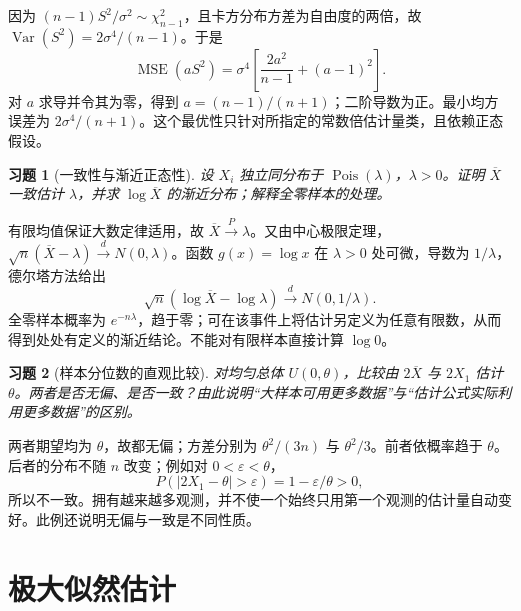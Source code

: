 \documentclass[12pt,fontset=fandol]{ctexart}
\newtheorem{exercise}{习题}[section]
\begin{document}
\begin{solve}\label{a:B9.6}因为 $(n-1)S^2/\sigma^2\sim\chi^2_{n-1}$，且卡方分布方差为自由度的两倍，故 $\operatorname{Var}(S^2)=2\sigma^4/(n-1)$。于是\[\operatorname{MSE}(aS^2)=\sigma^4\left[\frac{2a^2}{n-1}+(a-1)^2\right].\]对 $a$ 求导并令其为零，得到 $a=(n-1)/(n+1)$；二阶导数为正。最小均方误差为 $2\sigma^4/(n+1)$。这个最优性只针对所指定的常数倍估计量类，且依赖正态假设。\end{solve}

\begin{exercise}[一致性与渐近正态性]\label{q:B9.7}
设 $X_i$ 独立同分布于 $\operatorname{Pois}(\lambda)$，$\lambda>0$。证明 $\overline X$ 一致估计 $\lambda$，并求 $\log\overline X$ 的渐近分布；解释全零样本的处理。\par{}
\end{exercise}

\begin{solve}\label{a:B9.7}有限均值保证大数定律适用，故 $\overline X\xrightarrow{P}\lambda$。又由中心极限定理，$\sqrt n(\overline X-\lambda)\xrightarrow{d}N(0,\lambda)$。函数 $g(x)=\log x$ 在 $\lambda>0$ 处可微，导数为 $1/\lambda$，德尔塔方法给出\[\sqrt n(\log\overline X-\log\lambda)\xrightarrow{d}N(0,1/\lambda).\]全零样本概率为 $e^{-n\lambda}$，趋于零；可在该事件上将估计另定义为任意有限数，从而得到处处有定义的渐近结论。不能对有限样本直接计算 $\log0$。\end{solve}

\begin{exercise}[样本分位数的直观比较]\label{q:B9.8}
对均匀总体 $U(0,\theta)$，比较由 $2\overline X$ 与 $2X_1$ 估计 $\theta$。两者是否无偏、是否一致？由此说明“大样本可用更多数据”与“估计公式实际利用更多数据”的区别。\par{}
\end{exercise}

\begin{solve}\label{a:B9.8}两者期望均为 $\theta$，故都无偏；方差分别为 $\theta^2/(3n)$ 与 $\theta^2/3$。前者依概率趋于 $\theta$。后者的分布不随 $n$ 改变；例如对 $0<\varepsilon<\theta$，\[P(|2X_1-\theta|>\varepsilon)=1-\varepsilon/\theta>0,\]所以不一致。拥有越来越多观测，并不使一个始终只用第一个观测的估计量自动变好。此例还说明无偏与一致是不同性质。\end{solve}

\clearpage\section{极大似然估计}
\end{document}
